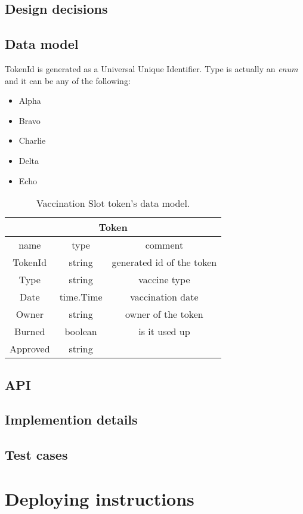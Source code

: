 \documentclass{article}
\begin{document}
\subsection{Design decisions}
\newpage
\subsection{Data model}

TokenId is generated as a Universal Unique Identifier. Type is actually an \emph{enum} and it can be any of the following:
\begin{itemize}
  \item Alpha
  \item Bravo
  \item Charlie
  \item Delta
  \item Echo
\end{itemize}

\begin{center}
  \begin{table}[h!]
    \centering
\begin{tabular}{|c | c | c |}
  \hline
  \multicolumn{3}{|c|}{Token} \\
  \hline
  name & type & comment \\
  \hline
  TokenId & string & generated id of the token \\
  Type & string & vaccine type \\
  Date & time.Time & vaccination date \\
  Owner & string & owner of the token \\
  Burned & boolean & is it used up \\
  Approved & string & \\
  \hline
  
\end{tabular}
\caption{Vaccination Slot token's data model.}
\end{table}
\end{center}



\subsection{API}
\subsection{Implemention details}
\subsection{Test cases}

\section{Deploying instructions}
\end{document}
